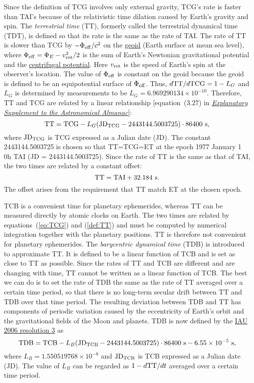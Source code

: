 \documentclass[12pt]{article}
\newcommand \beq {\begin{equation}}
\newcommand \eeq {\end{equation}}
\newcommand{\expl}{\href{http://www.uscibooks.com/urban.htm}{\it Explanatory Supplement to the Astronomical Almanac}}
\begin{document}
Since the definition of TCG involves only external gravity, TCG's rate is {\rm faster} 
than TAI's because of the relativistic time dilation caused by 
Earth's gravity and spin. 
The {\em terrestrial time} (TT), 
formerly called the {\rm terrestrial dynamical time} (TDT), is defined so that its rate 
is the same as the rate of TAI. 
The rate of TT is slower than TCG by $-\Phi_{\rm eff}/c^2$ on the 
\href{https://en.wikipedia.org/wiki/Geoid}{geoid} (Earth surface at mean sea level), 
where $\Phi_{\rm eff}=\Phi_E - v^2_{\rm rot}/2$ is the sum of Earth's Newtonian 
gravitational potential and the 
\href{http://scienceworld.wolfram.com/physics/CentrifugalPotential.html}{centrifugal 
potential}. Here $v_{\rm rot}$ is the speed of Earth's spin at the observer's location. 
The value of $\Phi_{\rm eff}$ 
is constant on the geoid because the geoid is defined to be an equipotential 
surface of $\Phi_{\rm eff}$. Thus, 
$d {\rm TT}/d {\rm TCG} = 1-L_G$ and $L_G$ is determined by measurements to be 
$L_G=6.969290134\times 10^{-10}$. Therefore, TT and TCG are related by a linear 
relationship [equation~(3.27) in \expl ]: 
\beq
  {\rm TT} = {\rm TCG} - L_G ({\rm JD}_{\rm TCG} - 2443144.5003725) \cdot 86400~{\rm s} ,
\label{def:TT}
\eeq
where ${\rm JD_{TCG}}$ is TCG expressed as a Julian date (JD). The 
constant 2443144.5003725 is chosen so that TT=TCG=ET at the epoch 1977 January 1 0h TAI 
(JD = 2443144.5003725). Since the rate of TT is the same as that of TAI, the two 
times are related by a constant offset:
\beq
  {\rm TT} = {\rm TAI} + 32.184~{\rm s} .
\eeq
The offset arises from the requirement that TT match ET at the chosen epoch.

TCB is a convenient time for planetary ephemerides, whereas TT can be measured 
directly by atomic clocks on Earth. The two times are related by equations~(\ref{eq:TCG}) 
and (\ref{def:TT}) and must be computed by numerical integration together with the 
planetary positions. TT is therefore not convenient for planetary ephemerides. 
The {\em barycentric dynamical time} (TDB) is introduced to approximate TT. It is 
defined to be a linear function of TCB and is set as close to TT as possible. Since 
the rates of TT and TCB are different and are changing with time, TT cannot be 
written as a linear function of TCB. The best we can do is to set the rate of 
TDB the same as the rate of TT averaged over a certain time period, so that there 
is no long-term secular drift between TT and TDB over that time period. 
The resulting deviation between TDB and TT 
has components of periodic variation caused by the eccentricity of Earth's orbit and 
the gravitational fields of the Moon and planets. TDB is now defined by the 
\href{https://www.iau.org/static/resolutions/IAU2006_Resol3.pdf}{IAU 2006 resolution 3} 
as
\beq
  {\rm TDB} = {\rm TCB} - L_B ({\rm JD_{TCB}} - 2443144.5003725)\cdot 86400~{\rm s} 
- 6.55\times 10^{-5}~{\rm s} ,
\eeq
where $L_B= 1.550519768\times 10^{-8}$ 
and ${\rm JD_{TCB}}$ is TCB expressed as a Julian date (JD). The value of $L_B$ 
can be regarded as $1-d {\rm TT}/dt$ averaged over a certain time period.
\end{document}

